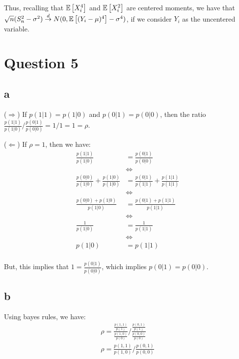 \documentclass[12pt]{paper}
\begin{document}
Thus, recalling that $\mathbb{E} \left [ X_i^4 \right ]$ and $\mathbb{E} \left [ X_i^2 \right ]$ are centered moments, we have that  $\sqrt{n}(S_n^2-\sigma^2)\overset{d}{\to}N(0,\mathbb{E} \left [ (Y_i-\mu)^4 \right ]-\sigma^4)$, if we consider $Y_i$ as the uncentered variable.

\section*{Question 5}

\subsection*{a}

($\Longrightarrow$) If $p(1|1)=p(1|0)$ and $p(0|1)=p(0|0)$, then the ratio $\frac{p(1|1)}{p(1|0)}\Big/\frac{p(0|1)}{p(0|0)}=1/1=1=\rho$.

($\Longleftarrow$) If $\rho=1$, then we have:
\begin{equation}
\begin{split}
\frac{p(1|1)}{p(1|0)}&=\frac{p(0|1)}{p(0|0)}\\
&\Longleftrightarrow\\
\frac{p(0|0)}{p(1|0)}+\frac{p(1|0)}{p(1|0)}&=\frac{p(0|1)}{p(1|1)}+\frac{p(1|1)}{p(1|1)}\\
&\Longleftrightarrow\\
\frac{p(0|0)+p(1|0)}{p(1|0)}&=\frac{p(0|1)+p(1|1)}{p(1|1)}\\
&\Longleftrightarrow\\
\frac{1}{p(1|0)}&=\frac{1}{p(1|1)}\\
&\Longleftrightarrow\\
p(1|0) &=p(1|1)\\
\end{split}
\end{equation}

But, this implies that $1=\frac{p(0|1)}{p(0|0)}$, which implies $p(0|1)=p(0|0)$.

\subsection*{b}

Using bayes rules, we have:
\begin{equation}
\begin{split}
\rho=\frac{\frac{p(1,1)}{p(1)}}{\frac{p(1,0)}{p(0)}}\Big/\frac{\frac{p(0,1)}{p(1)}}{\frac{p(0,0)}{p(0)}}\\
\rho=\frac{p(1,1)}{p(1,0)}\Big/\frac{p(0,1)}{p(0,0)}
\end{split}
\end{equation}
\end{document}
